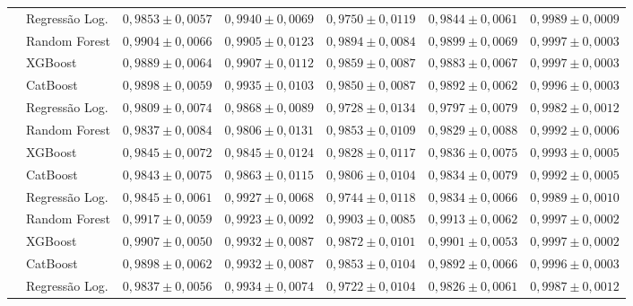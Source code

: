 \documentclass[msc]{on} %
\begin{document}
\begin{table}[htbp]
{\begin{tabular}{llccccc}
\hline
{} & Regressão Log. & $0{,}9853 \pm 0{,}0057$ & $0{,}9940 \pm 0{,}0069$ & $0{,}9750 \pm 0{,}0119$ & $0{,}9844 \pm 0{,}0061$ & $0{,}9989 \pm 0{,}0009$ \\
 & Random Forest & $0{,}9904 \pm 0{,}0066$ & $0{,}9905 \pm 0{,}0123$ & $0{,}9894 \pm 0{,}0084$ & $0{,}9899 \pm 0{,}0069$ & $0{,}9997 \pm 0{,}0003$ \\
 & XGBoost & $0{,}9889 \pm 0{,}0064$ & $0{,}9907 \pm 0{,}0112$ & $0{,}9859 \pm 0{,}0087$ & $0{,}9883 \pm 0{,}0067$ & $0{,}9997 \pm 0{,}0003$ \\
 & CatBoost & $0{,}9898 \pm 0{,}0059$ & $0{,}9935 \pm 0{,}0103$ & $0{,}9850 \pm 0{,}0087$ & $0{,}9892 \pm 0{,}0062$ & $0{,}9996 \pm 0{,}0003$ \\
\hline
{} & Regressão Log. & $0{,}9809 \pm 0{,}0074$ & $0{,}9868 \pm 0{,}0089$ & $0{,}9728 \pm 0{,}0134$ & $0{,}9797 \pm 0{,}0079$ & $0{,}9982 \pm 0{,}0012$ \\
 & Random Forest & $0{,}9837 \pm 0{,}0084$ & $0{,}9806 \pm 0{,}0131$ & $0{,}9853 \pm 0{,}0109$ & $0{,}9829 \pm 0{,}0088$ & $0{,}9992 \pm 0{,}0006$ \\
 & XGBoost & $0{,}9845 \pm 0{,}0072$ & $0{,}9845 \pm 0{,}0124$ & $0{,}9828 \pm 0{,}0117$ & $0{,}9836 \pm 0{,}0075$ & $0{,}9993 \pm 0{,}0005$ \\
 & CatBoost & $0{,}9843 \pm 0{,}0075$ & $0{,}9863 \pm 0{,}0115$ & $0{,}9806 \pm 0{,}0104$ & $0{,}9834 \pm 0{,}0079$ & $0{,}9992 \pm 0{,}0005$ \\
\hline
{} & Regressão Log. & $0{,}9845 \pm 0{,}0061$ & $0{,}9927 \pm 0{,}0068$ & $0{,}9744 \pm 0{,}0118$ & $0{,}9834 \pm 0{,}0066$ & $0{,}9989 \pm 0{,}0010$ \\
 & Random Forest & $0{,}9917 \pm 0{,}0059$ & $0{,}9923 \pm 0{,}0092$ & $0{,}9903 \pm 0{,}0085$ & $0{,}9913 \pm 0{,}0062$ & $0{,}9997 \pm 0{,}0002$ \\
 & XGBoost & $0{,}9907 \pm 0{,}0050$ & $0{,}9932 \pm 0{,}0087$ & $0{,}9872 \pm 0{,}0101$ & $0{,}9901 \pm 0{,}0053$ & $0{,}9997 \pm 0{,}0002$ \\
 & CatBoost & $0{,}9898 \pm 0{,}0062$ & $0{,}9932 \pm 0{,}0087$ & $0{,}9853 \pm 0{,}0104$ & $0{,}9892 \pm 0{,}0066$ & $0{,}9996 \pm 0{,}0003$ \\
\hline
{} & Regressão Log. & $0{,}9837 \pm 0{,}0056$ & $0{,}9934 \pm 0{,}0074$ & $0{,}9722 \pm 0{,}0104$ & $0{,}9826 \pm 0{,}0061$ & $0{,}9987 \pm 0{,}0012$ \\

\end{tabular}}
\end{table}
\end{document}
